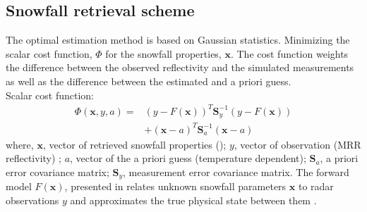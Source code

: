 \subsection{Snowfall retrieval scheme}\label{sec:ret_scheme}
The optimal estimation method is based on Gaussian statistics. Minimizing the scalar cost function, $\Phi$ for the snowfall properties, $\mathbf{x}$. The cost function weights the difference between the observed reflectivity and the simulated measurements as well as the difference between the estimated and a priori guess. %
\\
Scalar cost function:
\begin{equation}
\begin{split}
\Phi(\mathbf{x},y,a) = & (y- F(\mathbf{x}))^T \mathbf{S}_y^{-1} 			(y-F(\mathbf{x})) \\
&+(\mathbf{x}-a)^T \mathbf{S}_{a}^{-1} (\mathbf{x}-a)
\end{split} \label{eq:scalar_cost_fct}
\end{equation}
where, $\mathbf{x}$, vector of retrieved snowfall properties (); $y$, vector of observation (MRR reflectivity) ; $a$, vector of the a priori guess (temperature dependent); $\mathbf{S}_a$, a priori error covariance matrix; $\mathbf{S}_y$, measurement error covariance matrix. The forward model $F(\mathbf{x})$, presented in  relates unknown snowfall parameters $\mathbf{x}$ to radar observations $y$ and approximates the true physical state between them \citep{wood_estimating_2014,cooper_variational_2017}.
%
\\

